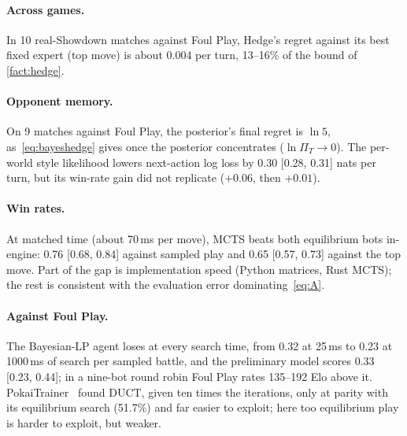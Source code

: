 \documentclass[10pt]{article}
\theoremstyle{tplain}
\theoremstyle{tdef}
\theoremstyle{trem}
\begin{document}
\paragraph{Across games.} In 10 real-Showdown matches against Foul Play, Hedge's regret against its best fixed expert (top move) is about 0.004 per turn, 13--16\% of the bound of \cref{fact:hedge}.

\paragraph{Opponent memory.}
\label{sec:exp-belief}
On 9 matches against Foul Play, the posterior's final regret is $\ln5$, as~\eqref{eq:bayeshedge} gives once the posterior concentrates ($\ln\Pi_T\to0$). The per-world style likelihood lowers next-action log loss by 0.30 [0.28, 0.31] nats per turn, but its win-rate gain did not replicate ($+0.06$, then $+0.01$).

\paragraph{Win rates.}
\label{sec:exp-showdown}
At matched time (about 70\,ms per move), MCTS beats both equilibrium bots in-engine: 0.76 [0.68, 0.84] against sampled play and 0.65 [0.57, 0.73] against the top move. Part of the gap is implementation speed (Python matrices, Rust MCTS); the rest is consistent with the evaluation error dominating~\eqref{eq:A}.


\paragraph{Against Foul Play.} The Bayesian-LP agent loses at every search time, from 0.32 at 25\,ms to 0.23 at 1000\,ms of search per sampled battle, and the preliminary model scores 0.33 [0.23, 0.44]; in a nine-bot round robin Foul Play rates 135--192 Elo above it. PokaiTrainer~\cite{Yu26} found DUCT, given ten times the iterations, only at parity with its equilibrium search (51.7\%) and far easier to exploit; here too equilibrium play is harder to exploit, but weaker.

\end{document}
